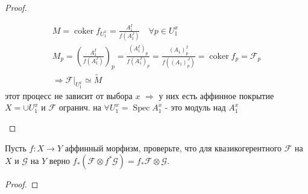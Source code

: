 \begin{proof}
\begin{itemize}
\begin{gather*}
    M = \operatorname{coker} f_{U^x_1} = \frac{A^I_1}{f(A^J_1)}\quad \forall p \in U^x_1\\
    M_p = \left(\frac{A^I_1}{f(A^J_1)}\right)_p
    = \frac{(A^I_1)_p}{f(A^J_1)_p}
    = \frac{(A_1)^I_p}{f((A_1)^J_p)}
    = \operatorname{coker} f_p = \mathcal{F}_p\\
    \Rightarrow \mathcal{F}\big|_{U^x_1} \simeq \tilde{M}
\end{gather*}
этот процесс не зависит от выбора $x$ $\Rightarrow$ у них есть аффинное покрытие $X = \cup U^x_1$ и $\mathcal{F}$ огранич. на $\forall U^x_1 = \operatorname{Spec} A^x_1$ - это модуль над $A^x_1$
\end{itemize}
\end{proof}
\vskip 0.6in





\begin{prob}
Пусть $f: X \rightarrow Y$ аффинный морфизм, проверьте, что для квазикогерентного $\mathcal{F}$ на $X$ и $\mathcal{G}$ на $Y$ верно $f_*\left(\mathcal{F} \otimes f^* \mathcal{G}\right)=f_* \mathcal{F} \otimes \mathcal{G}$.
\end{prob}
\begin{proof}

\end{proof}
